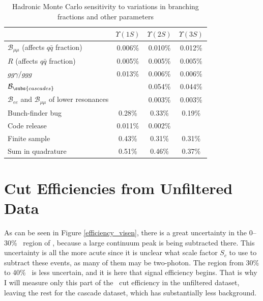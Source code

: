 \begin{table}[p]
  \caption{\label{efficiency_montecarlo2} Hadronic Monte Carlo
    sensitivity to variations in branching fractions and other
    parameters}
  \begin{center}
    \begin{tabular}{l c c c}
       & $\Upsilon(1S)$ & $\Upsilon(2S)$ & $\Upsilon(3S)$ \\\hline
      $\mathcal{B}_{\mu\mu}$ (affects $q\bar{q}$ fraction) & 0.006\% & 0.010\% & 0.012\% \\
      $R$ (affects $q\bar{q}$ fraction)                    & 0.005\% & 0.005\% & 0.005\% \\
      $gg\gamma/ggg$                                       & 0.013\% & 0.006\% & 0.006\% \\
      $\mathcal{B}_\subs{cascades}$                        &         & 0.054\% & 0.044\% \\
      $\mathcal{B}_{ee}$ and $\mathcal{B}_{\mu\mu}$ of lower resonances &         & 0.003\% & 0.003\% \\\hline
      Bunch-finder bug                                      & 0.28\%  & 0.33\%  & 0.19\% \\
      Code release                                         & 0.011\% & 0.002\% & \\
      Finite sample                                        & 0.43\%  & 0.31\%  & 0.31\% \\\hline
      Sum in quadrature                                    & 0.51\%  & 0.46\%  & 0.37\% \\
    \end{tabular}
  \end{center}
\end{table}

\section{Cut Efficiencies from Unfiltered Data}

As can be seen in Figure \ref{efficiency_visen}, there is a great
uncertainty in the 0--30\% \ecom\ region of \visen, because a large
continuum peak is being subtracted there.  This uncertainty is all the
more acute since it is unclear what scale factor $S_c$ to use to
subtract these events, as many of them may be two-photon.  The region
from 30\% to 40\% \ecom\ is less uncertain, and it is here that signal
efficiency begins.  That is why I will measure only this part of the
\visen\ cut efficiency in the unfiltered dataset, leaving the rest for
the cascade dataset, which has substantially less background.

